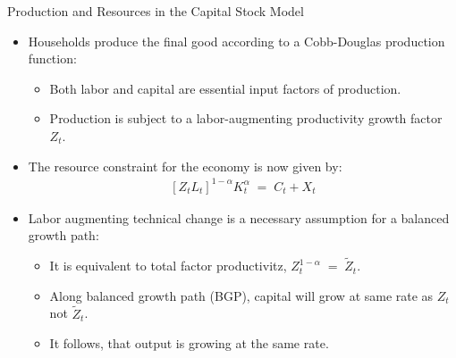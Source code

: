 \documentclass[10pt,c,aspectratio=1610,handout]{beamer}
\begin{document}
\begin{frame}{Production and Resources in the Capital Stock Model}%
  \begin{itemize}%
    \item[$\blacktriangleright$] Households produce the final good according to a Cobb-Douglas production function:%
    \begin{itemize}%
      \item[$\rightarrow$] Both labor and capital are essential input factors of production.%
      \item[$\rightarrow$] Production is subject to a labor-augmenting productivity growth factor $Z_{t}$.%
    \end{itemize}%
    \vspace*{0.2in}%
    \pause%
    \item[$\blacktriangleright$] The resource constraint for the economy is now given by:%
    \begin{align*}%
      \left[ Z_{t}L_{t}\right]^{1-\alpha }K_{t}^{\alpha } \; = \; C_{t} + X_{t}%
    \end{align*}%
    \pause%
    \item[$\blacktriangleright$] Labor augmenting technical change is a necessary assumption for a balanced growth path:%
    \begin{itemize}%
      \item[$\rightarrow$] It is equivalent to total factor productivitz, $Z_t^{1-\alpha} \; = \; \tilde Z_t$.%
      \item[$\rightarrow$] Along balanced growth path (BGP), capital will grow at same rate as $Z_t$ not $\tilde Z_t$.
      \item[$\rightarrow$] It follows, that output is growing at the same rate.%
    \end{itemize}%
  \end{itemize}%
\end{frame}%
\end{document}
